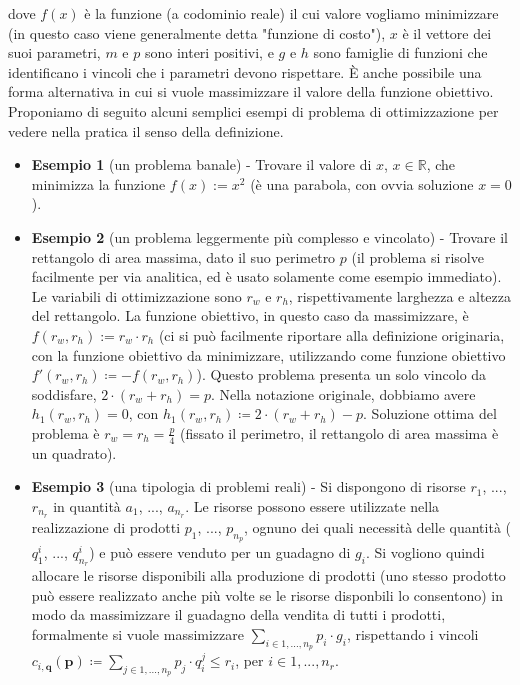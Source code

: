 \documentclass[12pt]{article}
\begin{document}
dove $f(x)$ è la funzione (a codominio reale) il cui valore vogliamo minimizzare (in questo caso viene generalmente detta "funzione di costo"), $x$ è il vettore dei suoi parametri, $m$ e $p$ sono interi positivi, e $g$ e $h$ sono famiglie di funzioni che identificano i vincoli che i parametri devono rispettare.
È anche possibile una forma alternativa in cui si vuole massimizzare il valore della funzione obiettivo.\newline
\newline
Proponiamo di seguito alcuni semplici esempi di problema di ottimizzazione per vedere nella pratica il senso della definizione.
\begin{itemize}
\item \textbf{Esempio 1} (un problema banale) - Trovare il valore di $x$, $x\in \mathbb{R}$, che minimizza la funzione $f(x) := x^2$ (è una parabola, con ovvia soluzione $x = 0$).

\item \textbf{Esempio 2} (un problema leggermente più complesso e vincolato) - Trovare il rettangolo di area massima, dato il suo perimetro $p$ (il problema si risolve facilmente per via analitica, ed è usato solamente come esempio immediato). Le variabili di ottimizzazione sono $r_w$ e $r_h$, rispettivamente larghezza e altezza del rettangolo. La funzione obiettivo, in questo caso da massimizzare, è $f(r_w, r_h) := r_w \cdot r_h$ (ci si può facilmente riportare alla definizione originaria, con la funzione obiettivo da minimizzare, utilizzando come funzione obiettivo $f'(r_w, r_h) \coloneqq -f(r_w, r_h)$). Questo problema presenta un solo vincolo da soddisfare, $2 \cdot (r_w+r_h) = p$. Nella notazione originale, dobbiamo avere $h_1(r_w, r_h) = 0$, con $h_1(r_w, r_h) \coloneqq 2 \cdot (r_w+r_h)-p$. Soluzione ottima del problema è $r_w = r_h = \frac{p}{4}$ (fissato il perimetro, il rettangolo di area massima è un quadrato).

\item \textbf{Esempio 3} (una tipologia di problemi reali) - Si dispongono di risorse $r_1$, ..., $r_{n_r}$ in quantità $a_1$, ..., $a_{n_r}$. Le risorse possono essere utilizzate nella realizzazione di prodotti $p_1$, ..., $p_{n_p}$, ognuno dei quali necessità delle quantità ($q^i_{1}$, ..., $q^i_{n_r}$) e può essere venduto per un guadagno di $g_i$. Si vogliono quindi allocare le risorse disponibili alla produzione di prodotti (uno stesso prodotto può essere realizzato anche più volte se le risorse disponbili lo consentono) in modo da massimizzare il guadagno della vendita di tutti i prodotti, formalmente si vuole massimizzare $\underset{\displaystyle i \in 1,...,n_p}{\sum} p_i \cdot g_i$, rispettando i vincoli $c_{i,\textbf{q}}(\textbf{p}) \coloneqq \underset{\displaystyle j \in 1,...,n_p}{\sum} p_j \cdot q^j_{i} \leq r_i$, per $i \in 1,...,n_r$.

\end{itemize}
\end{document}
